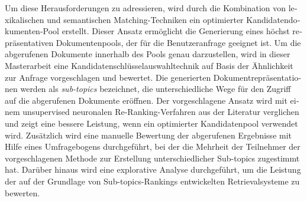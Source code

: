 \begin{otherlanguage}{ngerman}
Um diese Herausforderungen zu adressieren, wird durch die Kombination von lexikalischen und semantischen Matching-Techniken ein optimierter Kandidatendokumenten-Pool erstellt. Dieser Ansatz ermöglicht die Generierung eines höchst repräsentativen Dokumentenpools, der für die Benutzeranfrage geeignet ist. Um die abgerufenen Dokumente innerhalb des Pools genau darzustellen, wird in dieser Masterarbeit eine Kandidatenschlüsselauswahltechnik auf Basis der Ähnlichkeit zur Anfrage vorgeschlagen und bewertet. Die generierten Dokumentrepräsentationen werden als \emph{sub-topics} bezeichnet, die unterschiedliche Wege für den Zugriff auf die abgerufenen Dokumente eröffnen. Der vorgeschlagene Ansatz wird mit einem unsupervised neuronalen Re-Ranking-Verfahren aus der Literatur verglichen und zeigt eine bessere Leistung, wenn ein optimierter Kandidatenpool verwendet wird. Zusätzlich wird eine manuelle Bewertung der abgerufenen Ergebnisse mit Hilfe eines Umfragebogens durchgeführt, bei der die Mehrheit der Teilnehmer der vorgeschlagenen Methode zur Erstellung unterschiedlicher Sub-topics zugestimmt hat. Darüber hinaus wird eine explorative Analyse durchgeführt, um die Leistung der auf der Grundlage von Sub-topics-Rankings entwickelten Retrievalsysteme zu bewerten.\\
\\
\\
\\
\\
\\
\\
\\
\\
\\
\\
\\
\\
\\
\\
\\
\\
\\
\\


\end{otherlanguage}

